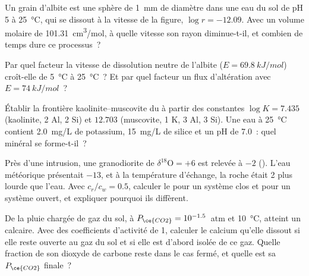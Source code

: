 \begin{exercise}[$\star\star$]\label{exo:b3:water-rock-interaction:7}
Un grain d'albite est une sphère de \qty{1}{mm} de diamètre dans une eau du sol de pH 5 à
\qty{25}{\celsius}, qui se dissout à la vitesse de la figure, $\log r = -12.09$.
Avec un volume molaire de \qty{101.31}{cm^3/mol}, à quelle vitesse son rayon
diminue-t-il, et combien de temps dure ce processus~?
\end{exercise}

\begin{exercise}[$\star\star$]\label{exo:b3:water-rock-interaction:8}
Par quel facteur la vitesse de dissolution neutre de l'albite ($E =
\qty{69.8}{kJ/mol}$) croît-elle de \qty{5}{\celsius} à \qty{25}{\celsius}~? Et par
quel facteur un flux d'altération avec $E = \qty{74}{kJ/mol}$~?
\end{exercise}

\begin{exercise}[$\star\star$]\label{exo:b3:water-rock-interaction:9}
Établir la frontière kaolinite--muscovite du  à partir des
constantes $\log K = 7.435$ (kaolinite, 2 Al, 2 Si) et $12.703$ (muscovite, 1
K, 3 Al, 3 Si). Une eau à \qty{25}{\celsius} contient \qty{2.0}{mg/L} de
potassium, \qty{15}{mg/L} de silice et un pH de 7.0~: quel minéral se forme-t-il~?
\end{exercise}

\begin{exercise}[$\star\star\star$]\label{exo:b3:water-rock-interaction:10}
Près d'une intrusion, une granodiorite de $\delta^{18}\mathrm O = +6$ est
relevée à $-2$ (\unit{\permil}). L'eau météorique présentait $-13$, et à la
température d'échange, la roche était \qty{2}{\permil} plus lourde que
l'eau. Avec $c_r/c_w = 0.5$, calculer le  pour un système
clos et pour un système ouvert, et expliquer pourquoi ils diffèrent.
\end{exercise}

\begin{exercise}[$\star\star\star$]\label{exo:b3:water-rock-interaction:11}
De la pluie chargée de gaz du sol, à $P_{\ce{CO2}} = 10^{-1.5}$~atm et
\qty{10}{\celsius}, atteint un calcaire. Avec des coefficients d'activité de 1,
calculer le calcium qu'elle dissout si elle reste ouverte au gaz du sol et si elle
est d'abord isolée de ce gaz. Quelle fraction de son dioxyde de carbone
reste dans le cas fermé, et quelle est sa $P_{\ce{CO2}}$ finale~?
\end{exercise}


